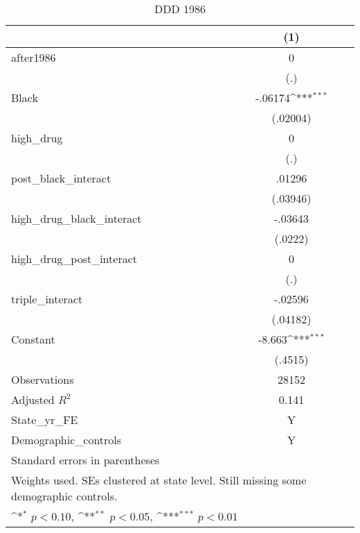 \begin{table}[htbp]\centering
\def\sym#1{\ifmmode^{#1}\else\(^{#1}\)\fi}
\caption{DDD 1986}
\begin{tabular}{l*{1}{c}}
\hline\hline
                    &\multicolumn{1}{c}{(1)}         \\
\hline
after1986           &           0         \\
                    &         (.)         \\
[1em]
Black               &     -.06174\sym{***}\\
                    &    (.02004)         \\
[1em]
high\_drug           &           0         \\
                    &         (.)         \\
[1em]
post\_black\_interact &      .01296         \\
                    &    (.03946)         \\
[1em]
high\_drug\_black\_interact&     -.03643         \\
                    &     (.0222)         \\
[1em]
high\_drug\_post\_interact&           0         \\
                    &         (.)         \\
[1em]
triple\_interact     &     -.02596         \\
                    &    (.04182)         \\
[1em]
Constant            &      -8.663\sym{***}\\
                    &     (.4515)         \\
\hline
Observations        &       28152         \\
Adjusted \(R^{2}\)  &       0.141         \\
State\_yr\_FE         &           Y         \\
Demographic\_controls&           Y         \\
\hline\hline
\multicolumn{2}{l}{\footnotesize Standard errors in parentheses}\\
\multicolumn{2}{l}{\footnotesize Weights used. SEs clustered at state level. Still missing some demographic controls.}\\
\multicolumn{2}{l}{\footnotesize \sym{*} \(p<0.10\), \sym{**} \(p<0.05\), \sym{***} \(p<0.01\)}\\
\end{tabular}
\end{table}
